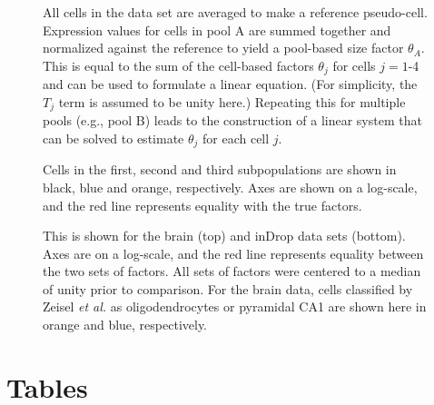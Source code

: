 \documentclass{bmcart}
\begin{document}
\begin{backmatter}
\begin{figure}[!h]
\caption{
    All cells in the data set are averaged to make a reference pseudo-cell.
    Expression values for cells in pool A are summed together and normalized against the reference to yield a pool-based size factor $\theta_A$.
    This is equal to the sum of the cell-based factors $\theta_j$ for cells $j=1$-4 and can be used to formulate a linear equation.
    (For simplicity, the $T_j$ term is assumed to be unity here.)
    Repeating this for multiple pools (e.g., pool B) leads to the construction of a linear system that can be solved to estimate $\theta_j$ for each cell $j$.
}
\label{fig:deconvolution}
\end{figure}

\begin{figure}[!h]
\caption{
    Cells in the first, second and third subpopulations are shown in black, blue and orange, respectively.
    Axes are shown on a log-scale, and the red line represents equality with the true factors.
}
\label{fig:sim_cluster_DE}
\end{figure}

\begin{figure}[!h]
\caption{
    This is shown for the brain (top) and inDrop data sets (bottom).
    Axes are on a log-scale, and the red line represents equality between the two sets of factors.
    All sets of factors were centered to a median of unity prior to comparison.
    For the brain data, cells classified by Zeisel \textit{et al.} as oligodendrocytes or pyramidal CA1 are shown here in orange and blue, respectively.
}   
\label{fig:real_comp}
\end{figure}



\section*{Tables}


\end{backmatter}
\end{document}
